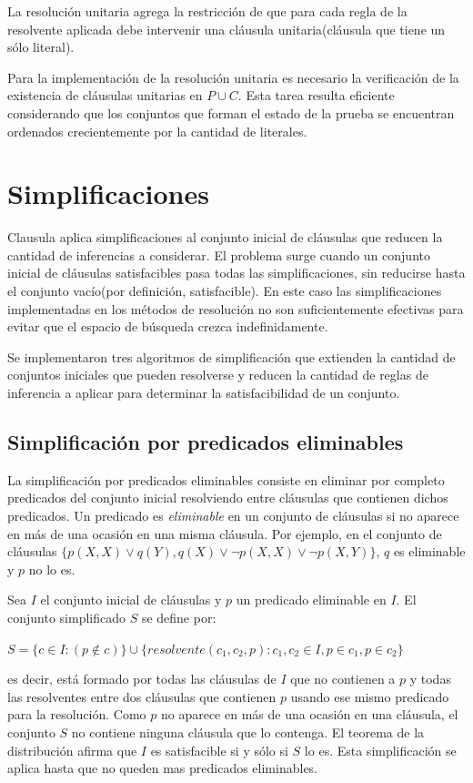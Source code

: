 \documentclass[a4paper,12pt]{article}
\begin{document}
La resolución unitaria agrega la restricción de que para cada regla de la resolvente aplicada debe
intervenir una cláusula unitaria(cláusula que tiene un sólo literal).

Para la implementación de la resolución unitaria es necesario la verificación de la
existencia de cláusulas unitarias en $P \cup C$. Esta tarea resulta eficiente considerando
que los conjuntos que forman el estado de la prueba se encuentran ordenados crecientemente por
la cantidad de literales.
\section{Simplificaciones}
Clausula aplica simplificaciones al conjunto inicial de cláusulas que reducen la cantidad
de inferencias a considerar. El problema surge cuando un conjunto inicial de cláusulas satisfacibles
pasa todas las simplificaciones, sin reducirse hasta el conjunto vacío(por definición, satisfacible). En
este caso las simplificaciones implementadas en los métodos de resolución no son suficientemente efectivas
para evitar que el espacio de búsqueda crezca indefinidamente.

Se implementaron tres algoritmos de simplificación que extienden la cantidad de conjuntos iniciales que
pueden resolverse y reducen la cantidad de reglas de inferencia a aplicar para determinar la satisfacibilidad
de un conjunto.
\subsection{Simplificación por predicados eliminables}
La simplificación por predicados eliminables\cite{Gelperin} consiste en eliminar por completo predicados del conjunto
inicial resolviendo entre cláusulas que contienen dichos predicados. Un predicado es \emph{eliminable} en un
conjunto de cláusulas si no aparece en más de una ocasión en una misma cláusula. Por ejemplo, en el conjunto
de cláusulas $\{p(X,X) \lor q(Y), q(X) \lor \lnot p(X,X) \lor \lnot p(X,Y)\}$, $q$ es eliminable y $p$ no lo es.

Sea $I$ el conjunto inicial de cláusulas y $p$ un predicado eliminable en $I$. El conjunto simplificado $S$
se define por:

 $S = \{c \in I : (p \notin c)\} \cup \{resolvente(c_1,c_2,p) : c_1,c_2  \in I, p\in c_1, p\in c_2\}$

es decir, está formado por todas las cláusulas de $I$ que no contienen a $p$ y todas las resolventes
entre dos cláusulas que contienen $p$ usando ese mismo predicado para la resolución. Como $p$ no aparece en más de una ocasión en una cláusula,
el conjunto $S$ no contiene ninguna cláusula que lo contenga. El teorema de la distribución\cite{Gelperin} afirma que $I$ es 
satisfacible si y sólo si $S$ lo es. Esta simplificación se aplica hasta que no queden mas predicados eliminables.
\end{document}
